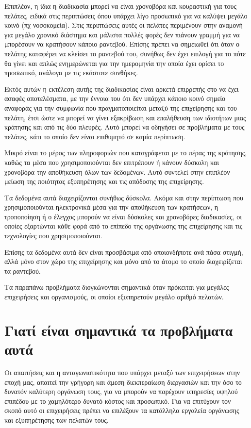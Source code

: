 Επιπλέον, η ίδια η διαδικασία μπορεί να είναι χρονοβόρα και κουραστική για τους πελάτες, ειδικά στις περιπτώσεις όπου υπάρχει λίγο προσωπικό για να καλύψει μεγάλο κοινό (πχ νοσοκομεία). Στις περιπτώσεις αυτές οι πελάτες περιμένουν στην αναμονή για μεγάλο χρονικό διάστημα και μάλιστα πολλές φορές δεν πιάνουν γραμμή για να μπορέσουν να κρατήσουν κάποιο ραντεβού. Επίσης πρέπει να σημειωθεί ότι όταν ο πελάτης καταφέρει να κλείσει το ραντεβού του, συνήθως δεν έχει επιλογή για το πότε θα γίνει και απλώς ενημερώνεται για την ημερομηνία την οποία έχει ορίσει το προσωπικό, ανάλογα με τις εκάστοτε συνθήκες.  

Εκτός αυτών η εκτέλεση αυτής της διαδικασίας είναι αρκετά επιρρεπής στο να έχει ασαφές αποτελέσματα, με την έννοια του ότι δεν υπάρχει κάποιο κοινό σημείο αναφοράς για την συμφωνία που πραγματοποιείται μεταξύ της επιχείρησης και του πελάτη, έτσι ώστε να μπορεί να γίνει εξακρίβωση και επαλήθευση των ιδιοτήτων μιας κράτησης και από τις δύο πλευρές. Αυτό μπορεί να οδηγήσει σε προβλήματα με τους πελάτες, κάτι το οποίο δεν είναι επιθυμητό σε καμία περίπτωση.

Μικρό είναι το μέρος των πληροφοριών που καταγράφεται με το πέρας της κράτησης, καθώς τα μέσα που χρησιμοποιούνται δεν επιτρέπουν ή κάνουν δύσκολη και χρονοβόρα την αποθήκευση όλων των δεδομένων. Αυτό συντελεί στην επιπλέον μείωση της ποιότητας εξυπηρέτησης και τις απόδοσης της επιχείρησης.

Τα δεδομένα αυτά διαχειρίζονται συνήθως δύσκολα. Ακόμα και στην περίπτωση που χρησιμοποιούνται ηλεκτρονικά μέσα για την αποθήκευση των κρατήσεων, η τροποποίηση ή ο έλεγχος μπορούν να είναι δύσκολες και χρονοβόρες διαδικασίες, οι οποίες εξαρτώνται κάθε φορά από το επίπεδο της οργάνωσης της επιχείρησης και τις τεχνολογίες που χρησιμοποιούνται. 

Επίσης τα δεδομένα αυτά δεν είναι προσβάσιμα από οποιονδήποτε ανά πάσα στιγμή, αλλά μόνο στον χώρο της επιχείρησης και μόνο από το άτομο το οποίο διαχειρίζεται τα ραντεβού. 

Τα παραπάνω προβλήματα διογκώνονται σημαντικά όταν πρόκειται για μεγάλες επιχειρήσεις και οργανισμούς, οι οποίοι εξυπηρετούν μεγάλο αριθμό πελατών.

\section {Γιατί είναι σημαντικά τα προβλήματα αυτά}
Οι απαιτήσεις και η ανταγωνιστικότητα που υπάρχει μεταξύ των επιχειρήσεων στην εποχή μας, απαιτεί την γρήγορη και άμεση διεκπεραίωση διεργασιών και την όσο το δυνατόν καλύτερη οργάνωση τους, για να μπορούν να παρέχουν υπηρεσίες υψηλού επιπέδου με το χαμηλότερο δυνατό κόστος και προσωπικό. Για να επιτύχουν τον σκοπό αυτό οι επιχειρήσεις πρέπει να επιλέξουν τα κατάλληλα εργαλεία οργάνωσης και εξυπηρέτησης των πελατών τους.

